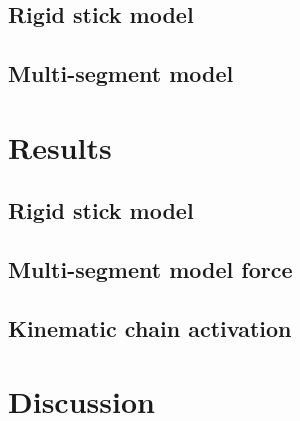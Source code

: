 \documentclass[floats,floatfix,showpacs,amssymb,prd,twocolumn,superscriptaddress,nofootinbib]{revtex4-1}
\begin{document}
\subsection{Rigid stick model}


\subsection{Multi-segment model}


\section{Results}
\label{sec:results}

\subsection{Rigid stick model}

\subsection{Multi-segment model force}

\subsection{Kinematic chain activation}

\section{Discussion}
\label{sec:discussion}


\end{document}
